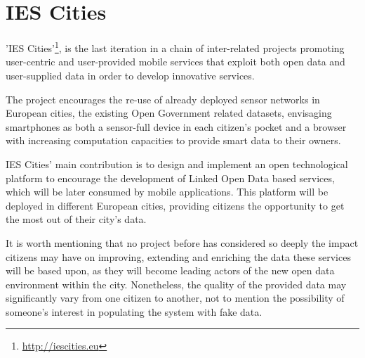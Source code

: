 \section{IES Cities}
\label{sec:ies_cities}

'IES Cities'\footnote{\url{http://iescities.eu}}, is the last iteration in a chain of inter-related projects promoting user-centric and user-provided mobile services that exploit both open data and user-supplied data in order to develop innovative services.

The project encourages the re-use of already deployed sensor networks in European cities, the existing Open Government related datasets, envisaging smartphones as both a sensor-full device in each citizen's pocket and a browser with increasing computation capacities to provide smart data to their owners.

IES Cities' main contribution is to design and implement an open technological platform to encourage the development of Linked Open Data based services, which will be later consumed by mobile applications. This platform will be deployed in different European cities, providing citizens the opportunity to get the most out of their city's data.

It is worth mentioning that no project before has considered so deeply the impact citizens may have on improving, extending and enriching the data these services will be based upon, as they will become leading actors of the new open data environment within the city. Nonetheless, the quality of the provided data may significantly vary from one citizen to another, not to mention the possibility of someone's interest in populating the system with fake data.
